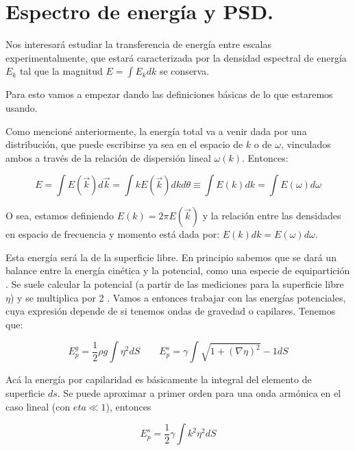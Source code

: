 
\section{Espectro de energía y PSD.}
Nos interesará estudiar la transferencia de energía entre escalas experimentalmente, que estará caracterizada por la densidad espectral de energía $E_k$ tal que la magnitud $E = \int E_k dk$ se conserva. 

Para esto vamos a empezar dando las definiciones básicas de lo que estaremos usando.

Como mencioné anteriormente, la energía total va a venir dada por una distribución, que puede escribirse ya sea en el espacio de $k$ o de $\omega$, vinculados ambos a través de la relación de dispersión lineal $\omega(k)$. Entonces:

\begin{equation}
	E = \int E(\vec k) d\vec k = \int k E(\vec k) dkd\theta \equiv \int E(k) dk = \int E(\omega) d\omega
\end{equation}

O sea, estamos definiendo $E(k) = 2\pi E(\vec k)$ y la relación entre las densidades en espacio de frecuencia y momento está dada por: $E(k) dk = E(\omega) d\omega$.

Esta energía será la de la superficie libre. En principio sabemos que se dará un balance entre la energía cinética y la potencial, como una especie de equipartición \cite{kunduFluidMechanics2014}. Se suele calcular la potencial (a partir de las mediciones para la superficie libre $\eta$) y se multiplica por 2 \cite{deikeEtudesExperimentalesNumeriques2013}. Vamos a entonces trabajar con las energías potenciales, cuya expresión depende de si tenemos ondas de gravedad o capilares. Tenemos que:

\begin{equation}
	E_p^g = \frac{1}{2} \rho g \int \eta^2 dS \qquad E_p^s = \gamma \int\sqrt{1+(\nabla\eta)^2} - 1 dS
\end{equation}

Acá la energía por capilaridad es básicamente la integral del elemento de superficie $ds$. Se puede aproximar a primer orden para una onda armónica en el caso lineal (con $eta\ll1$), entonces \cite{deikeEtudesExperimentalesNumeriques2013}

\begin{equation}
	E_p^s = \frac{1}{2} \gamma\int k^2\eta^2dS
\end{equation}

